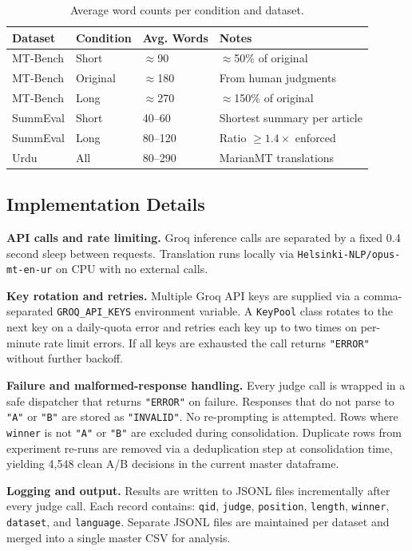 \documentclass[10pt,conference]{IEEEtran}
\begin{document}
\begin{table}[t]
\caption{Average word counts per condition and dataset.}
\label{tab:words}
\centering
\footnotesize
\begin{tabular}{@{}llll@{}}
\toprule
Dataset & Condition & Avg. Words & Notes \\
\midrule
MT-Bench & Short & $\approx$90 & $\approx$50\% of original \\
MT-Bench & Original & $\approx$180 & From human judgments \\
MT-Bench & Long & $\approx$270 & $\approx$150\% of original \\
SummEval & Short & 40--60 & Shortest summary per article \\
SummEval & Long & 80--120 & Ratio $\geq1.4\times$ enforced \\
Urdu & All & 80--290 & MarianMT translations \\
\bottomrule
\end{tabular}
\end{table}

\subsection{Implementation Details}
\textbf{API calls and rate limiting.} Groq inference calls are separated by a fixed 0.4 second sleep between requests. Translation runs locally via \texttt{Helsinki-NLP/opus-mt-en-ur} on CPU with no external calls.

\textbf{Key rotation and retries.} Multiple Groq API keys are supplied via a comma-separated \texttt{GROQ\_API\_KEYS} environment variable. A \texttt{KeyPool} class rotates to the next key on a daily-quota error and retries each key up to two times on per-minute rate limit errors. If all keys are exhausted the call returns \texttt{"ERROR"} without further backoff.

\textbf{Failure and malformed-response handling.} Every judge call is wrapped in a safe dispatcher that returns \texttt{"ERROR"} on failure. Responses that do not parse to \texttt{"A"} or \texttt{"B"} are stored as \texttt{"INVALID"}. No re-prompting is attempted. Rows where \texttt{winner} is not \texttt{"A"} or \texttt{"B"} are excluded during consolidation. Duplicate rows from experiment re-runs are removed via a deduplication step at consolidation time, yielding 4,548 clean A/B decisions in the current master dataframe.

\textbf{Logging and output.} Results are written to JSONL files incrementally after every judge call. Each record contains: \texttt{qid}, \texttt{judge}, \texttt{position}, \texttt{length}, \texttt{winner}, \texttt{dataset}, and \texttt{language}. Separate JSONL files are maintained per dataset and merged into a single master CSV for analysis.
\end{document}
